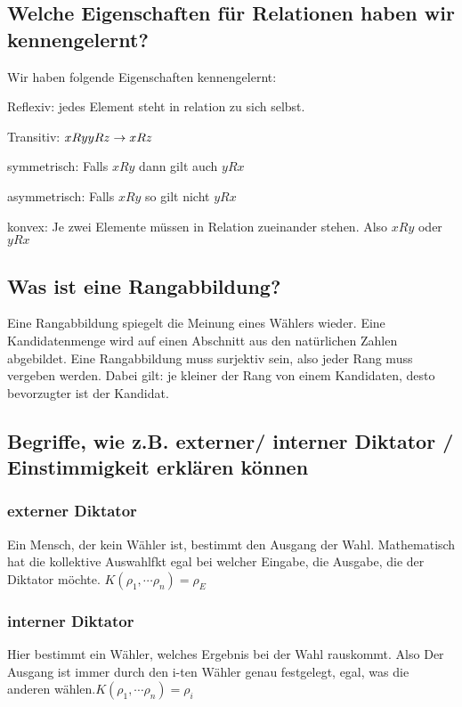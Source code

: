 \documentclass[]{article}
\begin{document}
\subsection*{Welche Eigenschaften für Relationen haben wir kennengelernt? }
Wir haben folgende Eigenschaften kennengelernt:
 
Reflexiv: jedes Element steht in relation zu sich selbst. 

Transitiv: $xRy \vspace{1ex} yRz \rightarrow xRz$

symmetrisch: Falls $xRy$ dann gilt auch $yRx$

asymmetrisch: Falls $xRy$ so gilt nicht $yRx$

konvex: Je zwei Elemente müssen in Relation zueinander stehen. Also $xRy$ oder $yRx$

\subsection*{Was ist eine Rangabbildung? }

Eine Rangabbildung spiegelt die Meinung eines Wählers wieder. Eine Kandidatenmenge wird auf einen Abschnitt aus den natürlichen Zahlen abgebildet. Eine Rangabbildung muss surjektiv sein, also jeder Rang muss vergeben werden. Dabei gilt: je kleiner der Rang von einem Kandidaten, desto bevorzugter ist der Kandidat.  

\subsection*{Begriffe, wie z.B. externer/ interner Diktator / Einstimmigkeit erklären können}

\subsubsection*{externer Diktator}
Ein Mensch, der kein Wähler ist, bestimmt den Ausgang der Wahl. Mathematisch hat die kollektive Auswahlfkt egal bei welcher Eingabe, die Ausgabe, die der Diktator möchte. $K(\rho_1, \cdots \rho_n)= \rho_E$

\subsubsection*{interner Diktator}
Hier bestimmt ein Wähler, welches Ergebnis bei der Wahl rauskommt. Also Der Ausgang ist immer durch den i-ten Wähler genau festgelegt, egal, was die anderen wählen.$K(\rho_1, \cdots \rho_n)= \rho_i$
\end{document}
